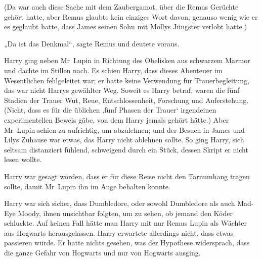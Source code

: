 (Da war auch diese Sache mit dem Zaubergamot, über die Remus Gerüchte gehört hatte, aber Remus glaubte kein einziges Wort davon, genauso wenig wie er es geglaubt hatte, dass James seinen Sohn mit Mollys Jüngster verlobt hatte.)

„Da ist das Denkmal“, sagte Remus und deutete voraus.

\later

Harry ging neben Mr~Lupin in Richtung des Obelisken aus schwarzem Marmor und dachte im Stillen nach. Es schien Harry, dass dieses Abenteuer im Wesentlichen fehlgeleitet war; er hatte keine Verwendung für Trauerbegleitung, das war nicht Harrys gewählter Weg. Soweit es Harry betraf, waren die fünf Stadien der Trauer Wut, Reue, Entschlossenheit, Forschung und Auferstehung. (Nicht, dass es für die üblichen ‚fünf Phasen der Trauer‘ irgendeinen experimentellen Beweis gäbe, von dem Harry jemals gehört hätte.) Aber Mr~Lupin schien zu aufrichtig, um abzulehnen; und der Besuch in James und Lilys Zuhause war etwas, das Harry nicht ablehnen sollte. So ging Harry, sich seltsam distanziert fühlend, schweigend durch ein Stück, dessen Skript er nicht lesen wollte.

Harry war gesagt worden, dass er für diese Reise nicht den Tarnumhang tragen sollte, damit Mr~Lupin ihn im Auge behalten konnte.

Harry war sich sicher, dass Dumbledore, oder sowohl Dumbledore als auch Mad-Eye Moody, ihnen unsichtbar folgten, um zu sehen, ob jemand den Köder schluckte. Auf keinen Fall hätte man Harry mit nur Remus Lupin als Wächter aus Hogwarts herausgelassen. Harry erwartete allerdings nicht, dass etwas passieren würde. Er hatte nichts gesehen, was der Hypothese widersprach, dass die ganze Gefahr von Hogwarts und nur von Hogwarts ausging.

